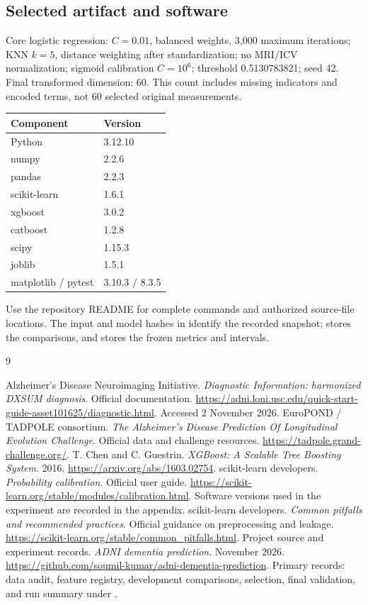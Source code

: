 \documentclass[11pt,a4paper]{article}
\newcommand{\code}[1]{\texttt{\detokenize{#1}}}
\begin{document}
\subsection{Selected artifact and software}
Core logistic regression: $C=0.01$, balanced weights, 3,000 maximum iterations; KNN $k=5$, distance weighting after standardization; no MRI/ICV normalization; sigmoid calibration $C=10^6$; threshold 0.5130783821; seed 42. Final transformed dimension: 60. This count includes missing indicators and encoded terms, not 60 selected original measurements.
\begin{center}\small\renewcommand{\arraystretch}{1.15}
\begin{tabular}{p{.45\linewidth}l}\toprule
Component & Version\\\midrule
Python & 3.12.10\\
numpy & 2.2.6\\
pandas & 2.2.3\\
scikit-learn & 1.6.1\\
xgboost & 3.0.2\\
catboost & 1.2.8\\
scipy & 1.15.3\\
joblib & 1.5.1\\
matplotlib / pytest & 3.10.3 / 8.3.5\\
\bottomrule\end{tabular}\end{center}
Use the repository README for complete commands and authorized source-file locations. The input and model hashes in  identify the recorded snapshot;  stores the comparisons, and  stores the frozen metrics and intervals.

\clearpage
\begin{thebibliography}{9}
 Alzheimer's Disease Neuroimaging Initiative. \emph{Diagnostic Information: harmonized DXSUM diagnosis}. Official documentation. \url{https://adni.loni.usc.edu/quick-start-guide-asset101625/diagnostic.html}. Accessed 2 November 2026.
 EuroPOND / TADPOLE consortium. \emph{The Alzheimer's Disease Prediction Of Longitudinal Evolution Challenge}. Official data and challenge resources. \url{https://tadpole.grand-challenge.org/}.
 T. Chen and C. Guestrin. \emph{XGBoost: A Scalable Tree Boosting System}. 2016. \url{https://arxiv.org/abs/1603.02754}.
 scikit-learn developers. \emph{Probability calibration}. Official user guide. \url{https://scikit-learn.org/stable/modules/calibration.html}. Software versions used in the experiment are recorded in the appendix.
 scikit-learn developers. \emph{Common pitfalls and recommended practices}. Official guidance on preprocessing and leakage. \url{https://scikit-learn.org/stable/common_pitfalls.html}.
 Project source and experiment records. \emph{ADNI dementia prediction}. November 2026. \url{https://github.com/soumil-kumar/adni-dementia-prediction}. Primary records: data audit, feature registry, development comparisons, selection, final validation, and run summary under \code{results/}.
\end{thebibliography}
\end{document}
